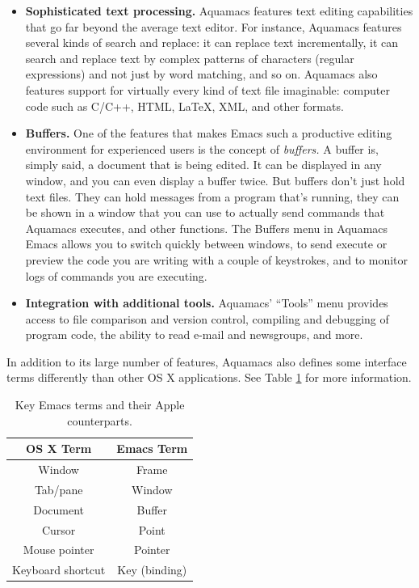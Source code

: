 \documentclass[11pt,letterpaper]{article}
\begin{document}
\begin{itemize}

\item \textbf{Sophisticated text processing.} Aquamacs features text
  editing capabilities that go far beyond the average text editor. For
  instance, Aquamacs features several kinds of search and replace: it
  can replace text incrementally, it can search and replace text by
  complex patterns of characters (regular expressions) and not just by
  word matching, and so on. Aquamacs also features support for
  virtually every kind of text file imaginable: computer code such as
  C/C++, HTML, \LaTeX, XML, and other formats. 
\item \textbf{Buffers.} One of the features that makes Emacs such a productive editing
environment for experienced users is the concept of \textit{buffers.}
A buffer is, simply said, a document that is being edited. It can be
displayed in any window, and you can even display a buffer twice. But
buffers don't just hold text files. They can hold messages from a
program that's running, they can be shown in a window that you can use to
actually send commands that Aquamacs executes, and other functions. The
Buffers menu in Aquamacs Emacs allows you to switch quickly between
windows, to send execute or preview the code you are writing with a
couple of keystrokes, and to monitor logs of commands you are
executing. 
\item \textbf{Integration with additional tools.} Aquamacs' ``Tools''
  menu provides access to file comparison and version control,
  compiling and debugging of program code, the ability to read e-mail
  and newsgroups, and more.

\end{itemize}

In addition to its large number of features, Aquamacs also defines
some interface terms differently than other OS X applications. See
Table \ref{tab:terms} for more information.


\begin{table}[t]
\begin{center}
\begin{tabular}{|c|c|}
\hline  OS X Term & Emacs Term  \\ 
\hline  Window &  Frame \\ 
\hline  Tab/pane  &  Window \\ 
\hline Document &  Buffer \\ 
\hline Cursor  & Point \\
\hline Mouse pointer & Pointer \\
\hline Keyboard shortcut &  Key (binding)\\ 
\hline 
\end{tabular} 
\caption{Key Emacs terms and their Apple counterparts.}
\label{tab:terms}
\end{center}
\end{table}
\end{document}
